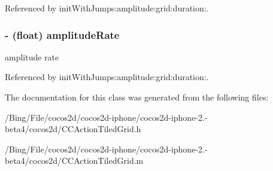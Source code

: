 Referenced by init\-With\-Jumps\-:amplitude\-:grid\-:duration\-:.

\hypertarget{interface_c_c_jump_tiles3_d_a7e4096e7bb7ac5f3d9aba8861c9adf72}{
\subsubsection[{amplitude\-Rate}]{\setlength{\rightskip}{0pt plus 5cm}-\/ (float) {\bf amplitude\-Rate}}}\label{interface_c_c_jump_tiles3_d_a7e4096e7bb7ac5f3d9aba8861c9adf72}
amplitude rate 

Referenced by init\-With\-Jumps\-:amplitude\-:grid\-:duration\-:.



The documentation for this class was generated from the following files\-:\begin{DoxyCompactItemize}
\item 
/\-Bing/\-File/cocos2d/cocos2d-\/iphone/cocos2d-\/iphone-\/2.-\/beta4/cocos2d/C\-C\-Action\-Tiled\-Grid.\-h\item 
/\-Bing/\-File/cocos2d/cocos2d-\/iphone/cocos2d-\/iphone-\/2.-\/beta4/cocos2d/C\-C\-Action\-Tiled\-Grid.\-m\end{DoxyCompactItemize}
